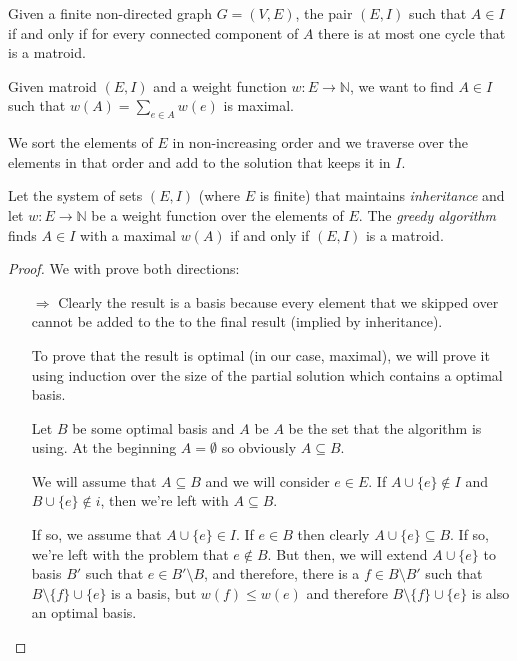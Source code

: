 \documentclass[00_complete]{subfiles}
\begin{document}
Given a finite non-directed graph $ G=(V,E) $, the pair $ (E,I) $ such that
$ A \in I $ if and only if for every connected component of $ A $ there is at
most one cycle that is a matroid.

Given matroid $ (E,I) $ and a weight function $ w: E \to \mathbb{N} $, we want
to find $ A \in I $ such that $ w(A) = \sum_{e \in A}w(e) $ is maximal.

\begin{definition}
    We sort the elements of $ E $ in non-increasing order and we traverse over
    the elements in that order and add to the solution that keeps it in $ I $.
\end{definition}

\begin{theorem}
    Let the system of sets $ (E,I) $ (where $ E $ is finite) that maintains
    \textit{inheritance} and let $ w: E \to \mathbb{N}$ be a weight function
    over the elements of $ E $. The \textit{greedy algorithm} finds $ A \in I $
    with a maximal $ w(A) $ if and only if $ (E, I) $ is a matroid.
\end{theorem}
\begin{proof}
    We with prove both directions:
    \begin{itemize}
        \item[$\Rightarrow$] Clearly the result is a basis because every element
            that we skipped over cannot be added to the to the final result
            (implied by inheritance).

            To prove that the result is optimal (in our case, maximal), we will
            prove it using induction over the size of the partial solution which
            contains a optimal basis.

            Let $ B $ be some optimal basis and $ A $ be $ A $ be the set that
            the algorithm is using. At the beginning $ A = \emptyset $ so
            obviously $ A \subseteq B $.

            We will assume that $ A \subseteq B $ and we will consider $ e \in
            E $. If $ A \cup \{e\} \notin I $ and $ B \cup \{e\} \notin i $,
            then we're left with $ A \subseteq B $.

            If so, we assume that $ A \cup \{e\} \in I $. If $ e \in B $ then
            clearly $ A \cup \{e\} \subseteq B$. If so, we're left with the
            problem that $ e \notin B $. But then, we will extend $ A \cup \{e\}
            $ to basis $ B' $ such that $ e \in B' \setminus B$, and therefore,
            there is a $ f \in B \setminus B' $ such that $ B \setminus \{f\}
            \cup \{e\} $ is a basis, but $ w(f) \leq w(e) $ and therefore $ B
            \setminus \{f\} \cup \{e\} $ is also an optimal basis. 




    \end{itemize}
\end{proof}
\end{document}
